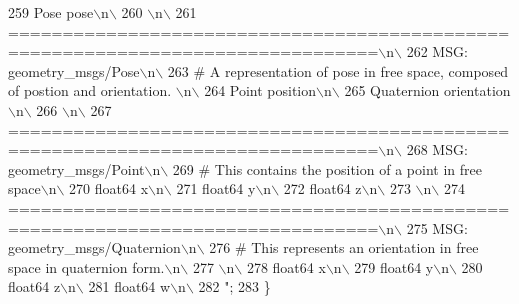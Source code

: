\begin{DoxyCode}
259 \textcolor{stringliteral}{Pose pose\(\backslash\)n\(\backslash\)}
260 \textcolor{stringliteral}{\(\backslash\)n\(\backslash\)}
261 \textcolor{stringliteral}{================================================================================\(\backslash\)n\(\backslash\)}
262 \textcolor{stringliteral}{MSG: geometry\_msgs/Pose\(\backslash\)n\(\backslash\)}
263 \textcolor{stringliteral}{# A representation of pose in free space, composed of postion and orientation. \(\backslash\)n\(\backslash\)}
264 \textcolor{stringliteral}{Point position\(\backslash\)n\(\backslash\)}
265 \textcolor{stringliteral}{Quaternion orientation\(\backslash\)n\(\backslash\)}
266 \textcolor{stringliteral}{\(\backslash\)n\(\backslash\)}
267 \textcolor{stringliteral}{================================================================================\(\backslash\)n\(\backslash\)}
268 \textcolor{stringliteral}{MSG: geometry\_msgs/Point\(\backslash\)n\(\backslash\)}
269 \textcolor{stringliteral}{# This contains the position of a point in free space\(\backslash\)n\(\backslash\)}
270 \textcolor{stringliteral}{float64 x\(\backslash\)n\(\backslash\)}
271 \textcolor{stringliteral}{float64 y\(\backslash\)n\(\backslash\)}
272 \textcolor{stringliteral}{float64 z\(\backslash\)n\(\backslash\)}
273 \textcolor{stringliteral}{\(\backslash\)n\(\backslash\)}
274 \textcolor{stringliteral}{================================================================================\(\backslash\)n\(\backslash\)}
275 \textcolor{stringliteral}{MSG: geometry\_msgs/Quaternion\(\backslash\)n\(\backslash\)}
276 \textcolor{stringliteral}{# This represents an orientation in free space in quaternion form.\(\backslash\)n\(\backslash\)}
277 \textcolor{stringliteral}{\(\backslash\)n\(\backslash\)}
278 \textcolor{stringliteral}{float64 x\(\backslash\)n\(\backslash\)}
279 \textcolor{stringliteral}{float64 y\(\backslash\)n\(\backslash\)}
280 \textcolor{stringliteral}{float64 z\(\backslash\)n\(\backslash\)}
281 \textcolor{stringliteral}{float64 w\(\backslash\)n\(\backslash\)}
282 \textcolor{stringliteral}{"};
283   \}
\end{DoxyCode}
